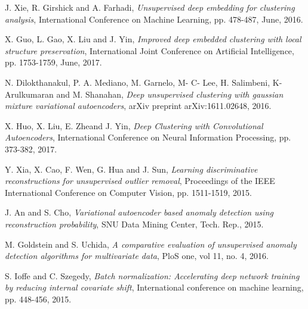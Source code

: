 \documentclass[conference]{IEEEtran}
\begin{document}

%
%
%
\begin{thebibliography}{1}

J. Xie, R. Girshick and A. Farhadi, \emph{Unsupervised deep embedding for clustering analysis}, International Conference on Machine Learning, pp. 478-487, June, 2016.

X. Guo, L. Gao, X. Liu and J. Yin, \emph{Improved deep embedded clustering with local structure preservation}, International Joint Conference on Artificial Intelligence, pp. 1753-1759, June, 2017.

N. Dilokthanakul, P. A. Mediano, M. Garnelo, M- C- Lee, H. Salimbeni, K- Arulkumaran and M. Shanahan, \emph{Deep unsupervised clustering with gaussian mixture variational autoencoders}, arXiv preprint arXiv:1611.02648, 2016.

X. Huo, X. Liu, E. Zheand J. Yin, \emph{Deep Clustering with Convolutional Autoencoders}, International Conference on Neural Information Processing, pp. 373-382, 2017.

Y. Xia, X. Cao, F. Wen, G. Hua and J. Sun, \emph{Learning discriminative reconstructions for unsupervised outlier removal}, Proceedings of the IEEE International Conference on Computer Vision, pp. 1511-1519, 2015.

J. An and S. Cho, \emph{Variational autoencoder based anomaly detection using reconstruction probability}, SNU Data Mining Center, Tech. Rep., 2015.

M. Goldstein and S. Uchida, \emph{A comparative evaluation of unsupervised anomaly detection algorithms for multivariate data}, PloS one, vol 11, no. 4, 2016.

S. Ioffe and C. Szegedy, \emph{Batch normalization: Accelerating deep network training by reducing internal covariate shift}, International conference on machine learning, pp. 448-456, 2015.


\end{thebibliography}
\end{document}

